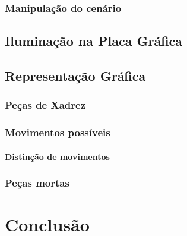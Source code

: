\documentclass[11pt,a4paper]{report}
\begin{document}
\subsection{Manipulação do cenário}

\section{Iluminação na Placa Gráfica}

\section{Representação Gráfica}

\subsection{Peças de Xadrez}

\subsection{Movimentos possíveis}

\subsubsection{Distinção de movimentos}

\subsection{Peças mortas}


\chapter{Conclusão}
%




%
%

\listoffigures

\end{document}
